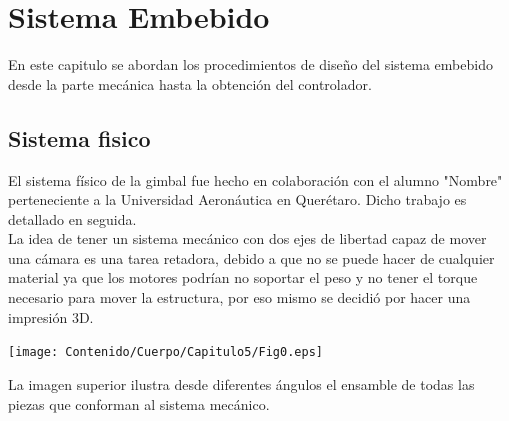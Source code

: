 \chapter{Sistema Embebido}

En este capitulo se abordan los procedimientos de diseño del sistema embebido desde la parte mecánica hasta la
obtención del controlador.

\section{Sistema fisico}
El sistema físico de la gimbal fue hecho en colaboración con el alumno "Nombre" perteneciente
a la Universidad Aeronáutica en Querétaro. Dicho trabajo es detallado en seguida.\\
La idea de tener un sistema mecánico con dos ejes de libertad capaz de mover una cámara
es una tarea retadora, debido a que no se puede hacer de cualquier material ya que
los motores podrían no soportar el peso y no tener el torque necesario para mover la
estructura, por eso mismo se decidió por hacer una impresión 3D.
\begin{center}
	\texttt{[image: Contenido/Cuerpo/Capitulo5/Fig0.eps]}
	\label{Fig1}
\end{center}
La imagen superior ilustra desde diferentes ángulos el ensamble de todas las piezas que
conforman al sistema mecánico.

